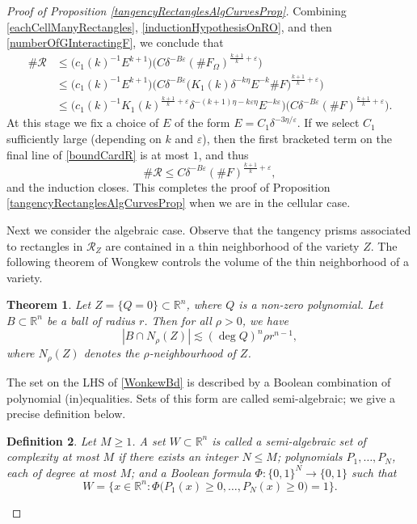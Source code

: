 \documentclass[letterpaper, reqno,11pt]{article}
\numberwithin{equation}{section}
\newcommand{\RR}{\mathbb{R}}
\newcommand{\eps}{\varepsilon}
\newtheorem{thm}{Theorem}
\numberwithin{thm}{section}
\newtheorem{defn}[thm]{Definition}
\theoremstyle{remark}
\begin{document}
\begin{proof}[Proof of Proposition \ref{tangencyRectanglesAlgCurvesProp}]
Combining \eqref{eachCellManyRectangles}, \eqref{inductionHypothesisOnRO}, and then \eqref{numberOfGInteractingF}, we conclude that
\begin{equation}\label{boundCardR}
\begin{split}
\#\mathcal{R}&\leq \Big(c_1(k)^{-1} E^{k+1}\Big)\Big( C  \delta^{-B\eps}(\# F_\Omega)^{\frac{k+1}{k}+\eps}\Big)\\
&\leq \Big(c_1(k)^{-1} E^{k+1}\Big)\Big(C  \delta^{-B\eps}\big(K_1(k)\delta^{-k\eta} E^{-k}\#F\big)^{\frac{k+1}{k}+\eps}\Big)\\
&\leq \Big(c_1(k)^{-1} K_1(k)^{\frac{k+1}{k}+\eps}\delta^{-(k+1)\eta-k\eps\eta}  E^{-k\eps} \Big) \Big( C  \delta^{-B\eps} (\#F)^{\frac{k+1}{k}+\eps}\Big).
\end{split}
\end{equation}
At this stage we fix a choice of $E$ of the form $E = C_1 \delta^{-3\eta/\eps}$. If we select $C_1$ sufficiently large (depending on $k$ and $\eps$), then the first bracketed term on the final line of \eqref{boundCardR} is at most $1$, and thus
\[
\#\mathcal{R}\leq C  \delta^{-B\eps} (\#F)^{\frac{k+1}{k}+\eps},
\]
and the induction closes. This completes the proof of Proposition \ref{tangencyRectanglesAlgCurvesProp} when we are in the cellular case. 



\medskip
{} 
Next we consider the algebraic case. Observe that the tangency prisms associated to rectangles in $\mathcal{R}_Z$ are contained in a thin neighborhood of the variety $Z$. The following theorem of Wongkew \cite{Wongkew} controls the volume of the thin neighborhood of a variety. 
%
%
\begin{thm}\label{WonkewThm}
Let $Z=\{Q=0\}\subset\RR^n$, where $Q$ is a non-zero polynomial. Let $B\subset\RR^n$ be a ball of radius $r$. Then for all $\rho>0$, we have 
\begin{equation}\label{WonkewBd}
|B \cap N_\rho(Z)|\lesssim (\operatorname{deg} Q)^{n}\rho r^{n-1},
\end{equation}
where $N_\rho(Z)$ denotes the $\rho$-neighbourhood of $Z$.
\end{thm}

The set on the LHS of \eqref{WonkewBd} is described by a Boolean combination of polynomial (in)equalities. Sets of this form are called semi-algebraic; we give a precise definition below. 
\begin{defn}\label{complexitySemiAlgSet}
Let $M\geq 1$. A set $W \subset\RR^n$ is called a \emph{semi-algebraic set} of complexity at most $M$ if there exists an integer $N\leq M$; polynomials $P_1,\ldots,P_N$, each of degree at most $M$; and a Boolean formula $\Phi\colon \{0,1\}^N\to\{0,1\}$ such that
\[
W = \big\{x\in\RR^n \colon \Phi\big( P_1(x)\geq 0, \ldots, P_N(x)\geq 0 \big)=1\big\}.
\]
\end{defn}




\end{proof}
\end{document}
